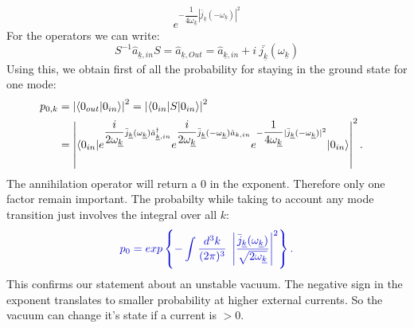 \documentclass[12pt, titlepage]{article}
\begin{document}
\begin{subappendices}
\begin{equation}
e^{-\dfrac{1}{4\omega_{\underline{k}}}|\bar{j}_{\underline{k}}(-\omega_{\underline{k}})|^{2}}
\end{equation}
For the operators we can write:
\begin{equation}
S^{-1}\hat{a}_{\underline{k},in}S=\hat{a}_{\underline{k},Out}=\hat{a}_{\underline{k},in} +i\ \bar{j_{\underline{k}}}(\omega_{\underline{k}})
\end{equation}
%
%
Using this, we obtain first of all the probability for staying in the ground state for one mode:
\begin{subequations}
\begin{align}
p_{0,k}&=\left| \braket{0_{out}|0_{in}}\right|^{2}=\left| \braket{0_{in}|S|0_{in}}\right|^{2}
	&\\
	&=\left| \braket{0_{in}|e^{\dfrac{i}{2\omega_{\underline{k}}}\bar{j}_{\underline{k}}(\omega_{\underline{k}})\hat{a}^{\dagger}_{\underline{k},in}}
e^{\dfrac{i}{2\omega_{\underline{k}}}\bar{j}_{\underline{k}}(-\omega_{\underline{k}})\hat{a}_{k,in}}
e^{-\dfrac{1}{4\omega_{\underline{k}}}|\bar{j}_{\underline{k}}(-\omega_{\underline{k}})|^{2}}|0_{in}}\right|^{2}
.
\end{align}
\end{subequations}
The annihilation operator will return a $ 0 $ in the exponent. Therefore only one factor remain important. The probabilty while taking to account any mode transition just involves the integral over all $ k $:
\begin{equation}\label{prob_staying}
 \textcolor[RGB]{0,0,204}{
	p_{0}
	= 	exp\left\lbrace -\int \dfrac{d^{3}k}{(2\pi)^{3}} \ 
 		 			 \left| \dfrac{\bar{j}_{\underline{k}}(\omega_{\underline{k}})}{\sqrt{2\omega_{\underline{k}}}} \right|^{2}
 		 			 \right\rbrace 
 .}
\end{equation}
This confirms our statement about an unstable vacuum. The negative sign in the exponent translates to smaller probability at higher external currents. So the vacuum can change it's state if a current is $ >0 $.
\\\\

\end{subappendices}
\end{document}
